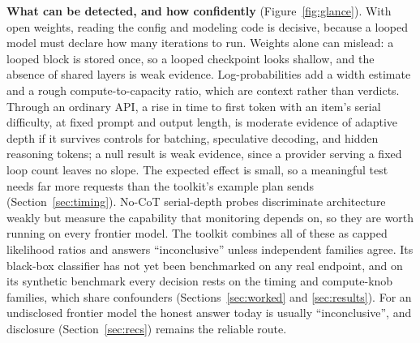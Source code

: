 \documentclass[11pt,letterpaper]{article}
\begin{document}
\textbf{What can be detected, and how confidently} (Figure~\ref{fig:glance}). With open weights, reading the config and modeling code is decisive, because a looped model must declare how many iterations to run. Weights alone can mislead: a looped block is stored once, so a looped checkpoint looks shallow, and the absence of shared layers is weak evidence. Log-probabilities add a width estimate and a rough compute-to-capacity ratio, which are context rather than verdicts. Through an ordinary API, a rise in time to first token with an item's serial difficulty, at fixed prompt and output length, is moderate evidence of adaptive depth if it survives controls for batching, speculative decoding, and hidden reasoning tokens; a null result is weak evidence, since a provider serving a fixed loop count leaves no slope. The expected effect is small, so a meaningful test needs far more requests than the toolkit's example plan sends (Section~\ref{sec:timing}). No-CoT serial-depth probes discriminate architecture weakly but measure the capability that monitoring depends on, so they are worth running on every frontier model. The toolkit combines all of these as capped likelihood ratios and answers ``inconclusive'' unless independent families agree. Its black-box classifier has not yet been benchmarked on any real endpoint, and on its synthetic benchmark every decision rests on the timing and compute-knob families, which share confounders (Sections~\ref{sec:worked} and \ref{sec:results}). For an undisclosed frontier model the honest answer today is usually ``inconclusive'', and disclosure (Section~\ref{sec:recs}) remains the reliable route.
\end{document}
